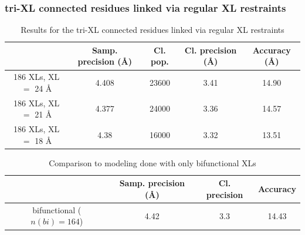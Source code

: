 \documentclass[a4paper,8pt]{beamer}
\begin{document}
\begin{frame}
\frametitle{tri-XL connected residues linked via regular XL restraints}

\begin{table}
  \centering
  \caption{Results for the tri-XL connected residues linked via regular XL restraints}
  \begin{tabular}{|c|c|c|c|c|}
      \hline
                                   & Samp. precision ({\AA}) & Cl. pop. & Cl. precision ({\AA}) & Accuracy ({\AA})\\ \hline
      186 XLs, XL $=$ 24 {\AA} & 4.408  & 23600 & 3.41 & 14.90\\ \hline
      186 XLs, XL $=$ 21 {\AA} & 4.377  & 24000 & 3.36 & 14.57\\ \hline
      186 XLs, XL $=$ 18 {\AA} & 4.38   & 16000 & 3.32 & 13.51\\ \hline
  \end{tabular}
\end{table}
\begin{table}
  \centering
  \caption{Comparison to modeling done with only bifunctional XLs}
  \begin{tabular}{|c|c|c|c|}
      \hline
                                   & Samp. precision ({\AA}) & Cl. precision & Accuracy\\ \hline
      bifunctional ($n(bi) = 164$) & 4.42  & 3.3 & 14.43 \\\hline
  \end{tabular}
\end{table}

\end{frame}
\end{document}
